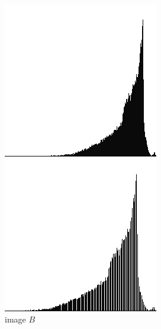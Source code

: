 \documentclass[12pt,a4paper,notitlepage,oneside,amsmath,amssymb]{article}
\begin{document}
\begin{CJK*}{UTF8}{bkai}
\begin{enumerate}[label=(\alph*)]
\begin{figure}[hbt!]
\begin{minipage}{.25\textwidth}
            \end{minipage}
            \begin{minipage}{.25\textwidth}
              \centering
              \includegraphics[width=.95\linewidth]{imageB_hist}
              \caption*{image \(B\)}
            \end{minipage}%
            \begin{minipage}{.25\textwidth}
              \centering
              \includegraphics[width=.95\linewidth]{imageC-1_5_hist}

\end{minipage}
\end{figure}
\end{enumerate}
\end{CJK*}
\end{document}
